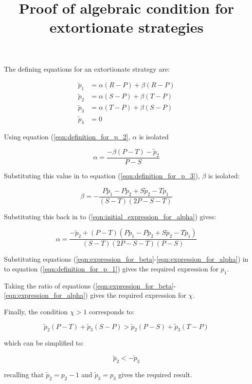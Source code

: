 \documentclass[a4]{article}
\title{Proof of algebraic condition for extortionate strategies}
\author{}
\date{}
\begin{document}
\maketitle

The defining equations for an extortionate strategy are:


\begin{align}
    \tilde p_1 & = \alpha (R - P) + \beta (R - P)\label{eqn:definition_for_p_1}\\
    \tilde p_2 & = \alpha (S - P) + \beta (T - P)\label{eqn:definition_for_p_2}\\
    \tilde p_3 & = \alpha (T - P) + \beta (S - P)\label{eqn:definition_for_p_3}\\
    \tilde p_4 & = 0
\end{align}

Using equation (\ref{eqn:definition_for_p_2}, \(\alpha\) is isolated

\begin{equation}\label{eqn:initial_expression_for_alpha}
    \alpha = \frac{-\beta (P - T) - \tilde p_2}
                  {P - S}
\end{equation}

Substituting this value in to equation (\ref{eqn:definition_for_p_3}), \(\beta\)
is isolated:

\begin{equation}\label{eqn:expression_for_beta}
    \beta = -\frac{P\tilde p_1 - P \tilde p_2 + S \tilde p_2 - T \tilde p_1}
                  {(S - T)(2 P - S - T)}
\end{equation}

Substituting this back in to (\ref{eqn:initial_expression_for_alpha}) gives:

\begin{equation}\label{eqn:expression_for_alpha}
    \alpha = \frac{-\tilde p_2 + (P - T)(P \tilde p_1 - P\tilde p_2 + S\tilde p_2 - T\tilde p_1)}
                  {(S - T)(2P - S - T)(P - S)}
\end{equation}

Substituting equations
(\ref{eqn:expression_for_beta}-\ref{eqn:expression_for_alpha}) in to
equation (\ref{eqn:definition_for_p_1}) gives the required expression for
\(p_1\).

Taking the ratio of equations
(\ref{eqn:expression_for_beta}-\ref{eqn:expression_for_alpha}) gives the
required expression for \(\chi\).

Finally, the condition \(\chi > 1\) corresponds to:


\begin{equation}
\tilde p_2 (P - T) + \tilde p_3 (S - P) >
                                      \tilde p_2 (P - S) + \tilde p_3 (T - P)
\end{equation}

which can be simplified to:

\begin{equation}
    \tilde p_2 < - \tilde p_3
\end{equation}

recalling that \(\tilde p_2 = p_2 - 1\) and \(\tilde p_3 = p_3\) gives the
required result.

\end{document}

